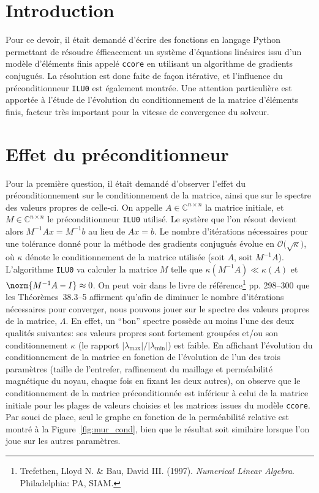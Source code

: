 \documentclass[11pt]{article}
\newcommand{\abs}[1]{\left\lvert#1\right\lvert}
\begin{document}
\section*{Introduction}
Pour ce devoir, il était demandé d'écrire des fonctions en langage Python permettant de résoudre éfficacement un système d'équations linéaires issu d'un modèle d'éléments finis appelé \lstinline[language=bash]{ccore} en utilisant un algorithme de gradients conjugués. La résolution est donc faite de façon itérative, et l'influence du préconditionneur \texttt{ILU0} est également montrée. Une attention particulière est apportée à l'étude de l'évolution du conditionnement de la matrice d'éléments finis, facteur très important pour la vitesse de convergence du solveur.

\section{Effet du préconditionneur}
\label{sec:prec}
Pour la première question, il était demandé d'observer l'effet du préconditionnement sur le conditionnement de la matrice, ainsi que sur le spectre des valeurs propres de celle-ci.
On appelle $A \in \mathbb{C}^{n \times n}$ la matrice initiale, et $M \in \mathbb{C}^{n \times n}$ le préconditionneur \texttt{ILU0} utilisé.
Le systère que l'on résout devient alors $M^{-1} A x = M^{-1}b$ au lieu de $Ax = b$.
Le nombre d'itérations nécessaires pour une tolérance donné pour la méthode des gradients conjugués évolue en $\mathcal{O}\big(\sqrt{\kappa}\big)$, où $\kappa$ dénote le conditionnement de la matrice utilisée (soit $A$, soit $M^{-1}A$).
L'algorithme \texttt{ILU0} va calculer la matrice $M$ telle que $\kappa(M^{-1}A) \ll \kappa(A)$ et $\norm{M^{-1}A - I} \approx 0$.
On peut voir dans le livre de référence\footnote{Trefethen, Lloyd N. \& Bau, David \textrm{III}. (1997). \textit{Numerical Linear Algebra}. Philadelphia: \textsc{PA}, \textsc{SIAM}.} pp. 298--300 que les Théorèmes~38.3--5 affirment qu'afin de diminuer le nombre d'itérations nécessaires pour converger, nous pouvons jouer sur le spectre des valeurs propres de la matrice, $\Lambda$. En effet, un \foreignquote{french}{bon} spectre possède au moins l'une des deux qualités suivantes: ses valeurs propres sont fortement groupées et/ou son conditionnement $\kappa$ (le rapport $\abs{\lambda_{\max}} / \abs{\lambda_{\min}}$) est faible.
En affichant l'évolution du conditionnement de la matrice en fonction de l'évolution de l'un des trois paramètres (taille de l'entrefer, raffinement du maillage et perméabilité magnétique du noyau, chaque fois en fixant les deux autres), on observe que le conditionnement de la matrice préconditionnée est inférieur à celui de la matrice initiale pour les plages de valeurs choisies et les matrices issues du modèle \texttt{ccore}. Par souci de place, seul le graphe en fonction de la perméabilité relative est montré à la Figure~\ref{fig:mur_cond}, bien que le résultat soit similaire lorsque l'on joue sur les autres paramètres.
\end{document}
